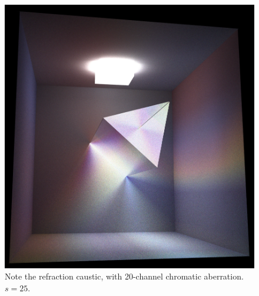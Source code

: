 \documentclass[12pt]{article}
\begin{document}
\begin{figure} 
\centering
  \includegraphics[width = 6 in]{fig7.png}
  \caption{ Note the refraction caustic, with 20-channel chromatic aberration.
$s = 25$.
}
\end{figure}
\end{document}
